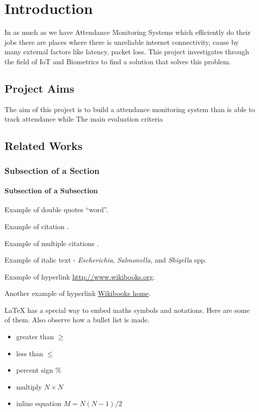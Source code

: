 \chapter{Introduction}

In as much as we have Attendance Monitoring Systems which efficiently do their jobs there are places where there is unreliable internet connectivity, cause by many external factors like latency, packet loss. This project investigates through the field of IoT and Biometrics to find a solution that solves this problem.


\section{Project Aims}

The aim of this project is to build a attendance monitoring system than is able to track attendance while 
The main evaluation criteria

\section{Related Works} 



\subsection{Subsection of a Section}
\subsubsection{Subsection of a Subsection}

Example of double quotes ``word''. 

Example of citation \citep{altschul1997gapped}.  

Example of multiple citations \citep{altschul1997gapped,baker2007novel}. 

Example of italic text - {\it Escherichia}, {\it Salmonella}, and {\it Shigella} spp. 

Example of hyperlink \url{http://www.wikibooks.org}. 

Another example of hyperlink \href{http://www.wikibooks.org}{Wikibooks home}. 

LaTeX{} has a special way to embed maths symbols and notations. Here are some of them. Also observe how a bullet list is made.

\begin{itemize}\itemsep0pt \parskip0pt 
\item greater than $\ge$
\item less than $\le$
\item percent sign \%
\item multiply $N\times N$
\item inline equation $M = N(N-1)/2$
\end{itemize}

